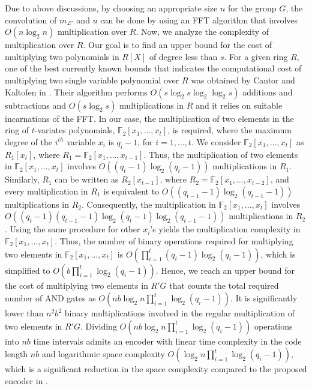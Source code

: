 \documentclass[journal,draftclsnofoot,onecolumn,12pt,twoside]{IEEEtran}
\begin{document}
Due to  above discussions, by choosing an appropriate size $n$ for the group $G$,  the convolution of $m_{\mathcal{L}'}$ and $u$
can be done by using an FFT algorithm that involves $O(n\log_2 n)$ multiplication over $R$. Now, we analyze the complexity of multiplication over $R$. Our goal is to find an upper bound for the cost of multiplying two polynomials in $R[X]$ of degree less than $s$.
For a given ring $R$, one of the best currently
known bounds that indicates the  computational cost of multiplying two single variable polynomial over $R$  was obtained by Cantor and Kaltofen in \cite{ring_mult}. Their algorithm performs $O(s \log_2 s \log_2 \log_2 s)$ additions and subtractions and $O(s \log_2 s)$
multiplications in $R$ and it relies on suitable incarnations of the FFT. In our case, the multiplication of two elements in the ring of $t$-variates polynomials, $\mathbb{F}_2[x_1,\ldots,x_t]$, is required, where the maximum degree of the $i^{th}$ variable $x_i$ is $q_i-1$, for $i=1,\ldots,t$. We  consider $\mathbb{F}_2[x_1,\ldots,x_t]$ as $R_1[x_t]$, where $R_1=\mathbb{F}_2[x_1,\ldots,x_{t-1}]$. Thus, the multiplication of two elements in $\mathbb{F}_2[x_1,\ldots,x_t]$ involves $O\left((q_t-1)\log_2(q_t-1)\right)$ multiplications in $R_1$. Similarly, $R_1$ can be written as $R_2[x_{t-1}]$, where $R_2=\mathbb{F}_2[x_1,\ldots,x_{t-2}]$, and every multiplication in $R_1$ is equivalent to $O\left((q_{t-1}-1)\log_2(q_{t-1}-1)\right)$ multiplications in $R_2$. Consequently, the multiplication in $\mathbb{F}_2[x_1,\ldots,x_t]$ involves $O((q_t-1)(q_{t-1}-1)\log_2(q_t-1)\log_2(q_{t-1}-1))$ multiplications in $R_2$.
Using the same procedure for other $x_i$'s  yields the multiplication complexity in $\mathbb{F}_2[x_1,\ldots,x_t]$. Thus, the  number of binary operations required for multiplying two elements  in $\mathbb{F}_2[x_1,\ldots,x_t]$ is $O\left(\prod_{i=1}^t (q_i-1)\log_2 (q_i-1)\right)$, which is simplified to $O\left(b\prod_{i=1}^t \log_2 (q_i-1)\right)$.
Hence, we reach an upper bound for the cost of multiplying two  elements in $R'G$ that counts the total required number of AND gates as $O\left(nb\log_2 n\prod_{i=1}^t \log_2 (q_i-1)\right)$. It is significantly lower than $n^2b^2$ binary multiplications involved in the regular multiplication of two elements in $R'G$. Dividing $O\left(nb\log_2 n\prod_{i=1}^t \log_2 (q_i-1)\right)$ operations into $nb$ time intervals admits an encoder with linear time complexity in the code length $nb$ and logarithmic space complexity  $O\left(\log_2 n\prod_{i=1}^t \log_2 (q_i-1)\right)$, which is a significant reduction in the space complexity compared to the proposed encoder in \cite{4}.
\end{document}
